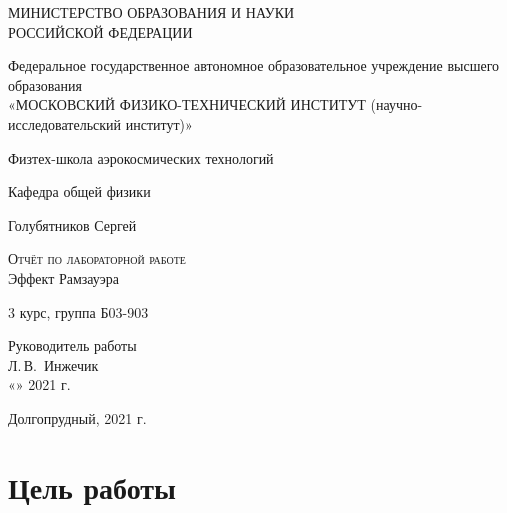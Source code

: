 \documentclass[14pt,a4paper]{scrartcl}
\begin{document}
\begin{titlepage}
  \begin{center}
    \large
    МИНИСТЕРСТВО ОБРАЗОВАНИЯ И НАУКИ\\ РОССИЙСКОЙ ФЕДЕРАЦИИ
     
    \vspace{0.5cm}
 
    Федеральное государственное автономное образовательное учреждение высшего образования \\ «МОСКОВСКИЙ ФИЗИКО-ТЕХНИЧЕСКИЙ ИНСТИТУТ (научно-исследовательский институт)»
    \vspace{0.25cm}

	Физтех-школа аэрокосмических технологий
     
    Кафедра общей физики
    \vfill
     
     

    Голубятников Сергей
    \vfill
 
    \textsc{Отчёт по лабораторной работе}\\[5mm]
     
    {\LARGE Эффект Рамзауэра}
  \bigskip
     
   3 курс, группа Б03-903
\end{center}
\vfill
 
\newlength{\ML}
\hfill
\begin{minipage}{0.4\textwidth}
  Руководитель работы\\
  \underline{\hspace{\ML}} Л.\,В.~Инжечик\\
  «\underline{\hspace{0.7cm}}» \underline{\hspace{2cm}} 2021 г.
\end{minipage}%
\bigskip
 

\vfill
 
\begin{center}
  Долгопрудный, 2021 г.
\end{center}
\end{titlepage}


\tableofcontents
{}
\newpage


\section{Цель работы}
\end{document}
